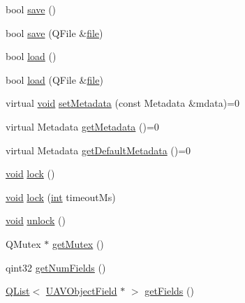 \begin{DoxyCompactItemize}
\item 
bool \hyperlink{group___u_a_v_objects_plugin_ga7c5e9973653217674183bfa3ba10e217}{save} ()
\item 
bool \hyperlink{group___u_a_v_objects_plugin_ga6b936966d89fb80b1138100edcd3e4cc}{save} (Q\-File \&\hyperlink{uavobjecttemplate_8m_a97c04efa65bcf0928abf9260bc5cbf46}{file})
\item 
bool \hyperlink{group___u_a_v_objects_plugin_ga8e49ecfdebf22f4834d1fc22d3effae7}{load} ()
\item 
bool \hyperlink{group___u_a_v_objects_plugin_ga0c4bcaec65373c03a2dbf22beae1e8a3}{load} (Q\-File \&\hyperlink{uavobjecttemplate_8m_a97c04efa65bcf0928abf9260bc5cbf46}{file})
\item 
virtual \hyperlink{group___u_a_v_objects_plugin_ga444cf2ff3f0ecbe028adce838d373f5c}{void} \hyperlink{group___u_a_v_objects_plugin_ga6cca5e5bf5d4f7ecfb03ef7cc9a93a95}{set\-Metadata} (const Metadata \&mdata)=0
\item 
virtual Metadata \hyperlink{group___u_a_v_objects_plugin_gaadeb5af3a70679bcb2b6360274e9c7de}{get\-Metadata} ()=0
\item 
virtual Metadata \hyperlink{group___u_a_v_objects_plugin_ga565410bc4fc71be87c359024f6cc8f3c}{get\-Default\-Metadata} ()=0
\item 
\hyperlink{group___u_a_v_objects_plugin_ga444cf2ff3f0ecbe028adce838d373f5c}{void} \hyperlink{group___u_a_v_objects_plugin_ga02661eea30150b9d24bc3a16423850b8}{lock} ()
\item 
\hyperlink{group___u_a_v_objects_plugin_ga444cf2ff3f0ecbe028adce838d373f5c}{void} \hyperlink{group___u_a_v_objects_plugin_ga17770eb02bf711b734a041622dccf889}{lock} (\hyperlink{ioapi_8h_a787fa3cf048117ba7123753c1e74fcd6}{int} timeout\-Ms)
\item 
\hyperlink{group___u_a_v_objects_plugin_ga444cf2ff3f0ecbe028adce838d373f5c}{void} \hyperlink{group___u_a_v_objects_plugin_ga2729ba3111341341127946ff1b9bb377}{unlock} ()
\item 
Q\-Mutex $\ast$ \hyperlink{group___u_a_v_objects_plugin_ga07e3fbd0f6a85b23e03afc165456a0ef}{get\-Mutex} ()
\item 
qint32 \hyperlink{group___u_a_v_objects_plugin_gab9b1f7925306319ea21f599bba0d227f}{get\-Num\-Fields} ()
\item 
\hyperlink{class_q_list}{Q\-List}$<$ \hyperlink{class_u_a_v_object_field}{U\-A\-V\-Object\-Field} $\ast$ $>$ \hyperlink{group___u_a_v_objects_plugin_ga043de5085e6ade44abfb005e320d10ca}{get\-Fields} ()
\item 

\end{DoxyCompactItemize}
